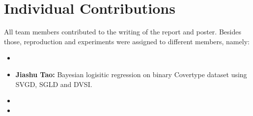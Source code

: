 \section{Individual Contributions}
All team members contributed to the writing of the report and poster. Besides those, reproduction and experiments were assigned to different members, namely:
\begin{itemize}
    \item 
    \item \textbf{Jiashu Tao:} Bayesian logisitic regression on binary Covertype dataset using SVGD, SGLD and DVSI.
    \item
    \item
\end{itemize}